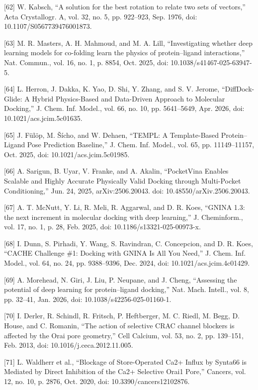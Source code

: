 {[}62{]} W. Kabsch, ``A solution for the best rotation to relate two sets of vectors,'' Acta Crystallogr. A, vol. 32, no. 5, pp. 922--923, Sep. 1976, doi: 10.1107/S0567739476001873.

{[}63{]} M. R. Masters, A. H. Mahmoud, and M. A. Lill, ``Investigating whether deep learning models for co-folding learn the physics of protein--ligand interactions,'' Nat. Commun., vol. 16, no. 1, p. 8854, Oct. 2025, doi: 10.1038/s41467-025-63947-5.

{[}64{]} L. Herron, J. Dakka, K. Yao, D. Shi, Y. Zhang, and S. V. Jerome, ``DiffDock-Glide: A Hybrid Physics-Based and Data-Driven Approach to Molecular Docking,'' J. Chem. Inf. Model., vol. 66, no. 10, pp. 5641--5649, Apr. 2026, doi: 10.1021/acs.jcim.5c01635.

{[}65{]} J. Fülöp, M. Šícho, and W. Dehaen, ``TEMPL: A Template-Based Protein--Ligand Pose Prediction Baseline,'' J. Chem. Inf. Model., vol. 65, pp. 11149--11157, Oct. 2025, doi: 10.1021/acs.jcim.5c01985.

{[}66{]} A. Sarigun, B. Uyar, V. Franke, and A. Akalin, ``PocketVina Enables Scalable and Highly Accurate Physically Valid Docking through Multi-Pocket Conditioning,'' Jun. 24, 2025, arXiv:2506.20043. doi: 10.48550/arXiv.2506.20043.

{[}67{]} A. T. McNutt, Y. Li, R. Meli, R. Aggarwal, and D. R. Koes, ``GNINA 1.3: the next increment in molecular docking with deep learning,'' J. Cheminform., vol. 17, no. 1, p. 28, Feb. 2025, doi: 10.1186/s13321-025-00973-x.

{[}68{]} I. Dunn, S. Pirhadi, Y. Wang, S. Ravindran, C. Concepcion, and D. R. Koes, ``CACHE Challenge \#1: Docking with GNINA Is All You Need,'' J. Chem. Inf. Model., vol. 64, no. 24, pp. 9388--9396, Dec. 2024, doi: 10.1021/acs.jcim.4c01429.

{[}69{]} A. Morehead, N. Giri, J. Liu, P. Neupane, and J. Cheng, ``Assessing the potential of deep learning for protein--ligand docking,'' Nat. Mach. Intell., vol. 8, pp. 32--41, Jan. 2026, doi: 10.1038/s42256-025-01160-1.

{[}70{]} I. Derler, R. Schindl, R. Fritsch, P. Heftberger, M. C. Riedl, M. Begg, D. House, and C. Romanin, ``The action of selective CRAC channel blockers is affected by the Orai pore geometry,'' Cell Calcium, vol. 53, no. 2, pp. 139--151, Feb. 2013, doi: 10.1016/j.ceca.2012.11.005.

{[}71{]} L. Waldherr et al., ``Blockage of Store-Operated Ca2+ Influx by Synta66 is Mediated by Direct Inhibition of the Ca2+ Selective Orai1 Pore,'' Cancers, vol. 12, no. 10, p. 2876, Oct. 2020, doi: 10.3390/cancers12102876.

